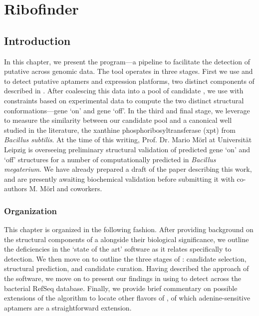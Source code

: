 
\newcommand{\fnaRetrievalTime}{\formatdate{25}{11}{2014} at \formattime{9}{14}{0}}

\chapter{Ribofinder}
\label{ch:rfinder}


\section{Introduction}
\label{sec:rfinder:intro}

In this chapter, we present the \rfinder program---a pipeline to facilitate the
detection of putative \grbs across genomic data. The \rfinder
tool operates in three stages. First we use \infernal
\citep{infernal,nawrocki:2013hk} and \tthp \citep{ermolaeva:2000cl} to detect
putative aptamers and expression platforms, two distinct components of
\rbs described in . After coalescing
this data into a pool of candidate \rbs, we use \rfold \citep{lorenz.amb11}
with constraints based on experimental data to compute the two distinct structural
conformations---gene `on' and gene `off'. In the third and final stage, we
leverage \foldalign \citep{gorodkin:1997tr,havgaard:2007ca} to measure the similarity between our
candidate pool and a
canonical \grb well studied in the literature, the
xanthine phosphoribosyltransferase (xpt) \grb from {\em Bacillus subtilis}. At the
time of this writing, Prof. Dr. Mario
M\"orl at Universit\"at Leipzig is overseeing preliminary structural
validation of predicted gene `on' and `off' structures for a number of
computationally predicted \grbs in {\em Bacillus megaterium}. We have already
prepared a draft of the paper describing this work, and are presently awaiting
biochemical validation before submitting it with co-authors M. M\"orl and
coworkers.

\subsection{Organization}
\label{subsec:rfinder:org}

This chapter is organized in the following fashion. After providing background
on the structural components of a \rb alongside their biological
significance, we outline the deficiencies in the `state of the art' software
as it relates specifically to \rb detection. We then move on to outline
the three stages of \rfinder: candidate selection, structural prediction, and
candidate curation. Having described the approach of the software, we move on
to present our findings in using \rfinder to detect \grbs across
the bacterial RefSeq database. Finally, we provide brief commentary on possible
extensions of the algorithm to locate other flavors of \rbs, of which
adenine-sensitive aptamers are a straightforward extension.

